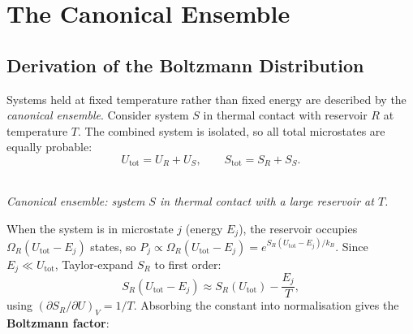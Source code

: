 
\chapter{The Canonical Ensemble}

\section{Derivation of the Boltzmann Distribution}

Systems held at fixed temperature rather than fixed energy are described by the \emph{canonical ensemble}. Consider system $S$ in thermal contact with reservoir $R$ at temperature $T$. The combined system is isolated, so all total microstates are equally probable:
\begin{equation}
    U_{\text{tot}} = U_R + U_S, \qquad S_{\text{tot}} = S_R + S_S.
\end{equation}

\begin{center}
\\[3pt]
{\small\itshape Canonical ensemble: system $S$ in thermal contact with a large reservoir at $T$.}
\end{center}

When the system is in microstate $j$ (energy $E_j$), the reservoir occupies $\Omega_R(U_{\text{tot}} - E_j)$ states, so $P_j \propto \Omega_R(U_{\text{tot}} - E_j) = e^{S_R(U_{\text{tot}}-E_j)/k_B}$. Since $E_j \ll U_{\text{tot}}$, Taylor-expand $S_R$ to first order:
\begin{equation}
    S_R\!\left(U_{\text{tot}} - E_j\right)
    \approx S_R(U_{\text{tot}}) - \frac{E_j}{T},
\end{equation}
using $(\partial S_R/\partial U)_V = 1/T$. Absorbing the constant into normalisation gives the \textbf{Boltzmann factor}:

